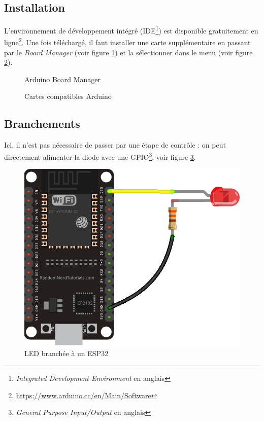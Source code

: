 \documentclass[11pt,a4paper,oneside,twocolumn]{article}
\begin{document}
\subsection{Installation}
L'environnement de développement intégré
(IDE\footnote{\emph{Integrated Development Environment} en anglais})
est disponible gratuitement
en ligne\footnote{\url{https://www.arduino.cc/en/Main/Software}}.
Une fois téléchargé, il faut installer une carte supplémentaire en passant par
le \emph{Board Manager} (voir figure \ref{fig:boardman}) et la sélectionner
dans le menu (voir figure \ref{fig:boardmenu}).

\begin{figure}[ht]
	\centering
	\caption{Arduino Board Manager}
	\label{fig:boardman}
\end{figure}

\begin{figure}[ht]
	\centering
	\caption{Cartes compatibles Arduino}
	\label{fig:boardmenu}
\end{figure}

\subsection{Branchements}
Ici, il n'est pas nécessaire de passer par une étape de contrôle : on peut
directement alimenter la diode avec une
GPIO\footnote{\emph{General Purpose Input/Output} en anglais}, voir figure
\ref{fig:ardled}.

\begin{figure}[ht]
	\centering
	\includegraphics[width=\linewidth]{esp32-led.png}
	\caption{LED branchée à un ESP32}
	\label{fig:ardled}
\end{figure}
\end{document}
